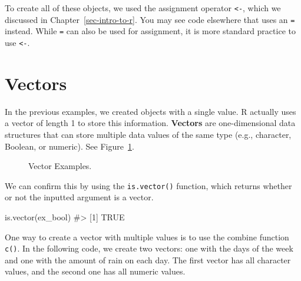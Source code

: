 \documentclass[
  letterpaper,
]{latex/krantz}
\makeatletter
\newenvironment{Shaded}{\begin{snugshade}}{\end{snugshade}}
\newcommand{\CommentTok}[1]{\textcolor[rgb]{0.37,0.37,0.37}{#1}}
\newcommand{\FunctionTok}[1]{\textcolor[rgb]{0.28,0.35,0.67}{#1}}
\newcommand{\NormalTok}[1]{\textcolor[rgb]{0.00,0.23,0.31}{#1}}
\newenvironment{kframe}{%
\medskip{}
\setlength{\fboxsep}{.8em}
 \def\at@end@of@kframe{}%
 \ifinner\ifhmode%
  \def\at@end@of@kframe{\end{minipage}}%
  \begin{minipage}{\columnwidth}%
 \fi\fi%
 \def\FrameCommand##1{\hskip\@totalleftmargin \hskip-\fboxsep
 \colorbox{shadecolor}{##1}\hskip-\fboxsep
     \hskip-\linewidth \hskip-\@totalleftmargin \hskip\columnwidth}%
 \MakeFramed {\advance\hsize-\width
   \@totalleftmargin\z@ \linewidth\hsize
   \@setminipage}}%
 {\par\unskip\endMakeFramed%
 \at@end@of@kframe}
\renewenvironment{Shaded}{\begin{kframe}}{\end{kframe}}
\makeatother
\begin{document}
To create all of these objects, we used the assignment
operator \texttt{\textless{}-}, which we
discussed in Chapter~\ref{sec-intro-to-r}. You may see code elsewhere
that uses an \texttt{=} instead. While \texttt{=} can also be used for
assignment, it is more standard practice to use \texttt{\textless{}-}.

\section{\texorpdfstring{Vectors
}{Vectors }}\label{vectors}

In the previous examples, we created objects with a single value. R
actually uses a vector of length 1 to store this information.
\textbf{Vectors} are one-dimensional data structures that can store
multiple data values of the same type (e.g., character, Boolean, or
numeric). See Figure~\ref{fig-vectors}.

\begin{figure}


\caption{\label{fig-vectors}Vector Examples.}

\end{figure}%

We can confirm this by using the
\texttt{is.vector()}
function, which returns whether or not the inputted argument is a
vector.

\begin{Shaded}
\begin{Highlighting}[]
\FunctionTok{is.vector}\NormalTok{(ex\_bool)}
\CommentTok{\#\textgreater{} [1] TRUE}
\end{Highlighting}
\end{Shaded}

One way to create a vector with multiple values is
to use the combine function
\texttt{c()}. In the following code,
we create two vectors: one with the days of the week and one with the
amount of rain on each day. The first vector has all character values,
and the second one has all numeric values.
\end{document}
